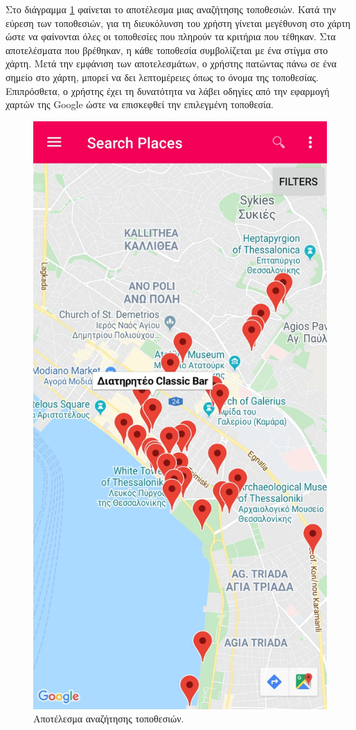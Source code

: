 \documentclass[oneside, 12pt]{book}
\begin{document}
Στο διάγραμμα  \ref{fig:search_places_2} φαίνεται το αποτέλεσμα μιας 
αναζήτησης τοποθεσιών. Κατά την εύρεση των τοποθεσιών, για τη 
διευκόλυνση του χρήστη γίνεται μεγέθυνση στο χάρτη ώστε να φαίνονται 
όλες οι τοποθεσίες που πληρούν τα κριτήρια που τέθηκαν. Στα 
αποτελέσματα που βρέθηκαν, η κάθε τοποθεσία συμβολίζεται με ένα στίγμα
στο χάρτη. Μετά την εμφάνιση των αποτελεσμάτων, ο χρήστης πατώντας
πάνω σε ένα σημείο στο χάρτη, μπορεί να δει λεπτομέρειες όπως το όνομα
της τοποθεσίας. Επιπρόσθετα, ο χρήστης έχει τη δυνατότητα να λάβει 
οδηγίες από την εφαρμογή χαρτών της Google ώστε να επισκεφθεί την 
επιλεγμένη τοποθεσία.
\begin{figure}[h]
  \centering
  \includegraphics[scale=0.15]{images/search_places_result.jpg}
  \caption{\label{fig:search_places_2}Αποτέλεσμα αναζήτησης τοποθεσιών.}
\end{figure}
\end{document}
